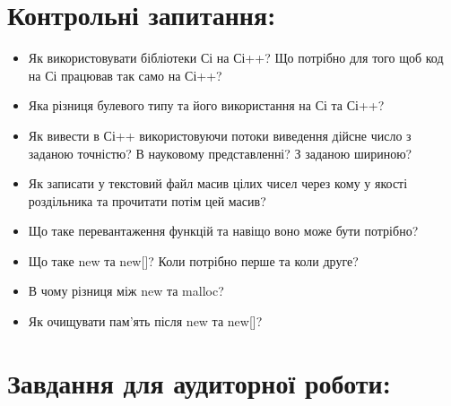 \documentclass[a5paper,titlepage,openany,twoside,draft]{book_unv}%
\begin{document}
\section{Контрольні запитання:}
\begin{itemize}

\item
  Як використовувати бібліотеки Сі на Сі++? Що потрібно для того щоб код
  на Сі працював так само на Сі++?
\item
  Яка різниця булевого типу та його використання на Сі та Сі++?
\item
  Як вивести в Сі++ використовуючи потоки виведення дійсне число з
  заданою точністю? В науковому представленні? З заданою шириною?
\item
  Як записати у текстовий файл масив цілих чисел через кому у якості
  роздільника та прочитати потім цей масив?
\item
  Що таке перевантаження функцій та навіщо воно може бути потрібно?
\item
  Що таке new та new{[}{]}? Коли потрібно перше та коли друге?
\item
  В чому різниця між new та malloc?
\item
  Як очищувати пам'ять після new та new{[}{]}?
\end{itemize}

\section{Завдання для аудиторної роботи:}
\end{document}
